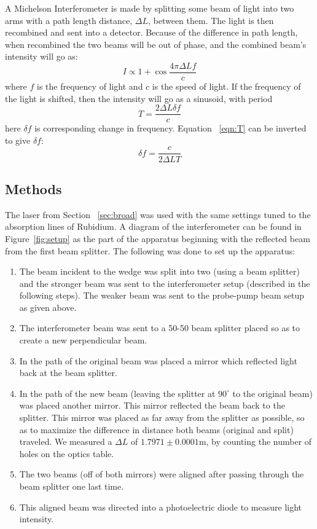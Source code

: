 \documentclass[paper=a4, fontsize=11pt]{scrartcl} %
\numberwithin{equation}{section}
\numberwithin{figure}{section}
\numberwithin{table}{section}
\begin{document}
A Michelson Interferometer is made by splitting some beam of light
into two arms with a path length distance, $\Delta L$, between
them. The light is then recombined and sent into a detector. Because
of the difference in path length, when recombined the two beams will
be out of phase, and the combined beam's intensity will go as:
\begin{equation}
I \propto 1 + \cos \frac{4\pi \Delta Lf}{c}
\end{equation}
where $f$ is the frequency of light and $c$ is the speed of light. If
the frequency of the light is shifted, then the intensity will go as a
sinusoid, with period 
\begin{equation}
\label{eqn:T}
T = \frac{2\Delta L \delta f}{c}
\end{equation}
here $\delta f$ is corresponding change in frequency. Equation
~\ref{eqn:T} can be inverted to give $\delta f$:
\begin{equation}
\label{eqn:df}
\delta f = \frac{c}{2\Delta L T}
\end{equation}

\subsection{Methods}

The laser from Section ~\ref{sec:broad} was used with the same
settings tuned to the absorption lines of Rubidium. A diagram of the
interferometer can be found in Figure~\ref{fig:setup} as the part of
the apparatus beginning with the reflected beam from the first beam splitter. The following was
done to set up the apparatus:
\begin{enumerate}
\item The beam incident to the wedge was split into two (using a beam splitter) and the stronger beam was sent to the interferometer setup (described in the following steps). The weaker beam was sent to the probe-pump beam setup as given above.
\item The interferometer beam was sent to a 50-50 beam splitter placed so as to create a new perpendicular beam.
\item In the path of the original beam was placed a mirror which reflected light back at the beam splitter.
\item In the path of the new beam (leaving the splitter at $90^\circ$
  to the original beam) was placed another mirror. This mirror
  reflected the beam back to the splitter. This mirror was placed as
  far away from the splitter as possible, so as to maximize the
  difference in distance both beams (original and split) traveled. We
  measured a $\Delta L$ of $1.7971 \pm 0.0001$m, by counting the
  number of holes on the optics table. 
\item The two beams (off of both mirrors) were aligned after passing through the beam splitter one last time.
\item This aligned beam was directed into a photoelectric diode to measure light intensity.
\end{enumerate}
\end{document}
